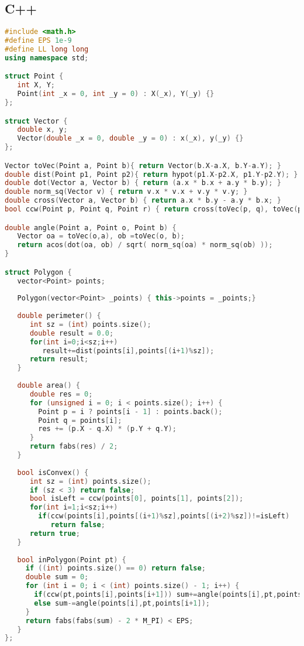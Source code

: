 \subsection{C++}
\begin{lstlisting}[language=C++]
#include <math.h>
#define EPS 1e-9
#define LL long long
using namespace std;

struct Point {
   int X, Y;
   Point(int _x = 0, int _y = 0) : X(_x), Y(_y) {}
};

struct Vector {
   double x, y;
   Vector(double _x = 0, double _y = 0) : x(_x), y(_y) {}
};

Vector toVec(Point a, Point b){ return Vector(b.X-a.X, b.Y-a.Y); }
double dist(Point p1, Point p2){ return hypot(p1.X-p2.X, p1.Y-p2.Y); }
double dot(Vector a, Vector b) { return (a.x * b.x + a.y * b.y); }
double norm_sq(Vector v) { return v.x * v.x + v.y * v.y; }
double cross(Vector a, Vector b) { return a.x * b.y - a.y * b.x; }
bool ccw(Point p, Point q, Point r) { return cross(toVec(p, q), toVec(p, r)) > 0; }

double angle(Point a, Point o, Point b) {
   Vector oa = toVec(o,a), ob =toVec(o, b);
   return acos(dot(oa, ob) / sqrt( norm_sq(oa) * norm_sq(ob) ));
}

struct Polygon {
   vector<Point> points;
	
   Polygon(vector<Point> _points) { this->points = _points;}
	
   double perimeter() {
   	  int sz = (int) points.size();
      double result = 0.0;
      for(int i=0;i<sz;i++)
         result+=dist(points[i],points[(i+1)%sz]);
      return result;
   }
   
   double area() {
      double res = 0;
      for (unsigned i = 0; i < points.size(); i++) {
      	Point p = i ? points[i - 1] : points.back();
      	Point q = points[i];
      	res += (p.X - q.X) * (p.Y + q.Y);
      }
      return fabs(res) / 2;
   }
	
   bool isConvex() {
      int sz = (int) points.size();
      if (sz < 3) return false;
      bool isLeft = ccw(points[0], points[1], points[2]);
      for(int i=1;i<sz;i++)
		if(ccw(points[i],points[(i+1)%sz],points[(i+2)%sz])!=isLeft)
		   return false;
      return true;
   }
	
   bool inPolygon(Point pt) {
     if ((int) points.size() == 0) return false;
     double sum = 0;
     for (int i = 0; i < (int) points.size() - 1; i++) {
       if(ccw(pt,points[i],points[i+1])) sum+=angle(points[i],pt,points[i+1]);
       else sum-=angle(points[i],pt,points[i+1]);
     }
     return fabs(fabs(sum) - 2 * M_PI) < EPS;
   }
};
\end{lstlisting}

